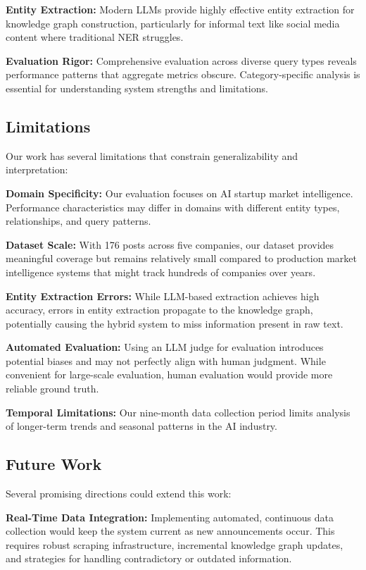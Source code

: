 \documentclass[11pt,twocolumn]{article}
\begin{document}
\textbf{Entity Extraction:} Modern LLMs provide highly effective entity extraction for knowledge graph construction, particularly for informal text like social media content where traditional NER struggles.

\textbf{Evaluation Rigor:} Comprehensive evaluation across diverse query types reveals performance patterns that aggregate metrics obscure. Category-specific analysis is essential for understanding system strengths and limitations.

\subsection{Limitations}

Our work has several limitations that constrain generalizability and interpretation:

\textbf{Domain Specificity:} Our evaluation focuses on AI startup market intelligence. Performance characteristics may differ in domains with different entity types, relationships, and query patterns.

\textbf{Dataset Scale:} With 176 posts across five companies, our dataset provides meaningful coverage but remains relatively small compared to production market intelligence systems that might track hundreds of companies over years.

\textbf{Entity Extraction Errors:} While LLM-based extraction achieves high accuracy, errors in entity extraction propagate to the knowledge graph, potentially causing the hybrid system to miss information present in raw text.

\textbf{Automated Evaluation:} Using an LLM judge for evaluation introduces potential biases and may not perfectly align with human judgment. While convenient for large-scale evaluation, human evaluation would provide more reliable ground truth.

\textbf{Temporal Limitations:} Our nine-month data collection period limits analysis of longer-term trends and seasonal patterns in the AI industry.

\subsection{Future Work}

Several promising directions could extend this work:

\textbf{Real-Time Data Integration:} Implementing automated, continuous data collection would keep the system current as new announcements occur. This requires robust scraping infrastructure, incremental knowledge graph updates, and strategies for handling contradictory or outdated information.
\end{document}
